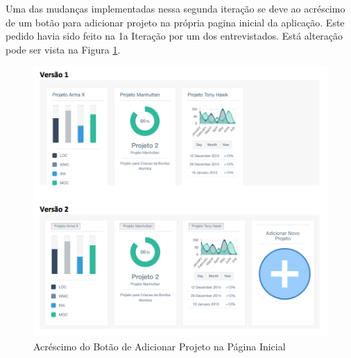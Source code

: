  Uma das mudanças implementadas nessa segunda iteração se deve ao acréscimo de um botão para adicionar projeto na própria pagina inicial da aplicação. Este pedido havia sido feito na 1a Iteração por um dos entrevistados. Está alteração pode ser vista na Figura \ref{img:compara_botao}.
 
 
 \graphicspath{{figuras/}}
 \begin{figure}[h!]
 \centering
 \includegraphics[scale=0.60]{compara_adicao_botao}
 \caption{Acréscimo do Botão de Adicionar Projeto na Página Inicial}
 \label{img:compara_botao}
 \end{figure}
 
 
 
